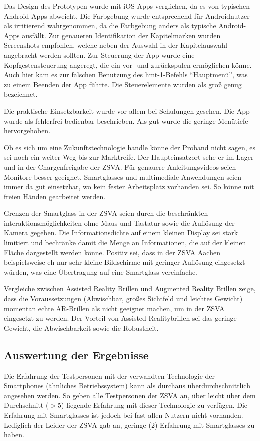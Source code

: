 Das Design des Prototypen wurde mit iOS-Apps verglichen, da es von typischen Android Apps abweicht. Die Farbgebung wurde entsprechend für Androidnutzer als irritierend wahrgenommen, da die Farbgebung anders als typische Android-Apps ausfällt. Zur genaueren Identifikation der Kapitelmarken wurden Screenshots empfohlen, welche neben der Auswahl in der Kapitelauswahl angebracht werden sollten. Zur Steuerung der App wurde eine Kopfgestensteuerung angeregt, die ein vor- und zurückspulen ermöglichen könne. Auch hier kam es zur falschen Benutzung des hmt-1-Befehls \enquote{Hauptmenü}, was zu einem Beenden der App führte. Die Steuerelemente wurden als groß genug bezeichnet.

Die praktische Einsetzbarkeit wurde vor allem bei Schulungen gesehen. Die App wurde als fehlerfrei bedienbar beschrieben. Als gut wurde die geringe Menütiefe hervorgehoben.

Ob es sich um eine Zukunftstechnologie handle könne der Proband nicht sagen, es sei noch ein weiter Weg bis zur Marktreife. Der Haupteinsatzort sehe er im Lager und in der Chargenfreigabe der ZSVA. Für genauere Anleitungsvideos seien Monitore besser geeignet. Smartglasses und multimediale Anwendungen seien immer da gut einsetzbar, wo kein fester Arbeitsplatz vorhanden sei. So könne mit freien Händen gearbeitet werden.

Grenzen der Smartglass in der ZSVA seien durch die beschränkten interaktionsmöglichkeiten ohne Maus und Tastatur sowie die Auflösung der Kamera gegeben. Die Informationsdichte auf einem kleinen Display sei stark limitiert und bechränke damit die Menge an Informationen, die auf der kleinen Fläche dargestellt werden könne. Positiv sei, dass in der ZSVA Aachen beispielsweise eh nur sehr kleine Bildschirme mit geringer Auflösung eingesetzt würden, was eine Übertragung auf eine Smartglass vereinfache.

Vergleiche zwischen Assisted Reality Brillen und Augmented Reality Brillen zeige, dass die Voraussetzungen (Abwischbar, großes Sichtfeld und leichtes Gewicht) momentan echte AR-Brillen als nicht geeignet machen, um in der ZSVA eingesetzt zu werden. Der Vorteil von Assisted Realitybrillen sei das geringe Gewicht, die Abwischbarkeit sowie die Robustheit.



%
%
%
\subsection{Auswertung der Ergebnisse}
\label{sec:Auswertung_der_Ergebnisse}
%
%
%
Die Erfahrung der Testpersonen mit der verwandten Technologie der Smartphones (ähnliches Betriebssystem) kann als durchaus überdurchschnittlich angesehen werden. So geben alle Testpersonen der ZSVA an, über leicht über dem Durchschnitt ($>5$) liegende Erfahrung mit dieser Technologie zu verfügen. Die Erfahrung mit Smartglasses ist jedoch bei fast allen Nutzern nicht vorhanden. Lediglich der Leider der ZSVA gab an, geringe (2) Erfahrung mit Smartglasses zu haben.

